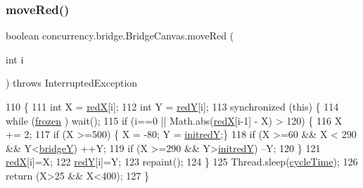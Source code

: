 \subsubsection{\texorpdfstring{move\+Red()}{moveRed()}}
{\footnotesize\ttfamily boolean concurrency.\+bridge.\+Bridge\+Canvas.\+move\+Red (\begin{DoxyParamCaption}\item[{int}]{i }\end{DoxyParamCaption}) throws Interrupted\+Exception\hspace{0.3cm}{\ttfamily [inline]}}


\begin{DoxyCode}
110                                                               \{
111         \textcolor{keywordtype}{int} X = \mbox{\hyperlink{classconcurrency_1_1bridge_1_1_bridge_canvas_a649bbe8c1ea85f52794e197b79c1b5fc}{redX}}[i];
112         \textcolor{keywordtype}{int} Y = \mbox{\hyperlink{classconcurrency_1_1bridge_1_1_bridge_canvas_a39d21c119f401d65e7887fe6af161434}{redY}}[i];
113         \textcolor{keyword}{synchronized} (\textcolor{keyword}{this}) \{
114             \textcolor{keywordflow}{while} (\mbox{\hyperlink{classconcurrency_1_1bridge_1_1_bridge_canvas_a1f2ccdf0586d82761c1c372e24643c0e}{frozen}} ) wait();
115             \textcolor{keywordflow}{if} (i==0 || Math.abs(\mbox{\hyperlink{classconcurrency_1_1bridge_1_1_bridge_canvas_a649bbe8c1ea85f52794e197b79c1b5fc}{redX}}[i-1] - X) > 120) \{
116                 X += 2;
117                 \textcolor{keywordflow}{if} (X >=500) \{ X = -80; Y = \mbox{\hyperlink{classconcurrency_1_1bridge_1_1_bridge_canvas_a116ddc62a00b1a3b726c73036b25b121}{initredY}};\}
118                 \textcolor{keywordflow}{if} (X >=60 && X < 290 && Y<\mbox{\hyperlink{classconcurrency_1_1bridge_1_1_bridge_canvas_acf28c3801b04a1ddf864888e06d0cc4a}{bridgeY}}) ++Y;
119                 \textcolor{keywordflow}{if} (X >=290 && Y>\mbox{\hyperlink{classconcurrency_1_1bridge_1_1_bridge_canvas_a116ddc62a00b1a3b726c73036b25b121}{initredY}}) --Y;
120             \}
121             \mbox{\hyperlink{classconcurrency_1_1bridge_1_1_bridge_canvas_a649bbe8c1ea85f52794e197b79c1b5fc}{redX}}[i]=X;
122             \mbox{\hyperlink{classconcurrency_1_1bridge_1_1_bridge_canvas_a39d21c119f401d65e7887fe6af161434}{redY}}[i]=Y;
123             repaint();
124         \}
125         Thread.sleep(\mbox{\hyperlink{classconcurrency_1_1bridge_1_1_bridge_canvas_a65748edb1df4eae39a0c357cd9db326e}{cycleTime}});
126         \textcolor{keywordflow}{return} (X>25 && X<400);
127      \}
\end{DoxyCode}
\mbox{\label{classconcurrency_1_1bridge_1_1_bridge_canvas_a9b8e8df5174b22c0ebf8096e651a4440}} 
